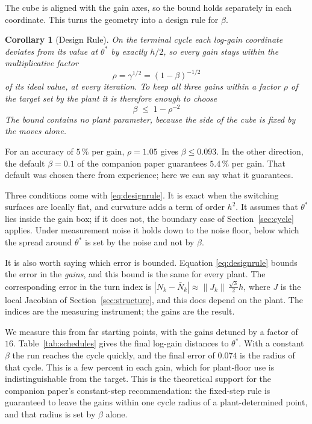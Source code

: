 \documentclass[letterpaper, 10pt, conference, twocolumn]{ieeeconf}
\newtheorem{corollary}{Corollary}
\newcommand{\Nbar}{\bar{N}}
\begin{document}
The cube is aligned with the gain axes, so the bound holds separately in each
coordinate. This turns the geometry into a design rule for $\beta$.

\begin{corollary}[Design Rule]
\label{cor:design}
On the terminal cycle each log-gain coordinate deviates from its value at
$\theta^*$ by exactly $h/2$, so every gain stays within the multiplicative
factor
\begin{equation}
\rho = \gamma^{1/2} = (1-\beta)^{-1/2}
\label{eq:designfwd}
\end{equation}
of its ideal value, at every iteration. To keep all three gains within a
factor $\rho$ of the target set by the plant it is therefore enough to choose
\begin{equation}
\boxed{\;\beta \;\le\; 1 - \rho^{-2}\;}
\label{eq:designrule}
\end{equation}
The bound contains no plant parameter, because the side of the cube is fixed
by the moves alone.
\end{corollary}

For an accuracy of $5\,\%$ per gain, $\rho = 1.05$ gives $\beta \le 0.093$. In
the other direction, the default $\beta = 0.1$ of the companion paper
guarantees $5.4\,\%$ per gain. That default was chosen there from experience;
here we can say what it guarantees.

Three conditions come with \eqref{eq:designrule}. It is exact when the
switching surfaces are locally flat, and curvature adds a term of order $h^2$.
It assumes that $\theta^*$ lies inside the gain box; if it does not, the
boundary case of Section~\ref{sec:cycle} applies. Under measurement noise it
holds down to the noise floor, below which the spread around $\theta^*$ is set
by the noise and not by $\beta$.

It is also worth saying which error is bounded. Equation
\eqref{eq:designrule} bounds the error in the \emph{gains}, and this bound is
the same for every plant. The corresponding error in the turn index is
$|N_k - \Nbar_k| \approx \|J_k\| \, \tfrac{\sqrt{3}}{2} h$, where $J$ is the
local Jacobian of Section~\ref{sec:structure}, and this does depend on the
plant. The indices are the measuring instrument; the gains are the result.

We measure this from far starting points, with the gains detuned by a factor
of $16$. Table~\ref{tab:schedules} gives the final log-gain distances to
$\theta^*$. With a constant $\beta$ the run reaches the cycle quickly, and the
final error of $0.074$ is the radius of that cycle. This is a few percent in
each gain, which for
plant-floor use is indistinguishable from the target. This is the theoretical
support for the companion paper's constant-step recommendation: the fixed-step
rule is guaranteed to leave the gains within one cycle radius of a
plant-determined point, and that radius is set by $\beta$ alone.
\end{document}
